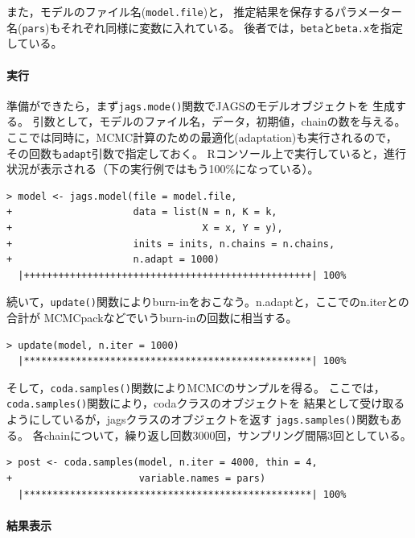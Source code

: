 \documentclass[11pt,uplatex]{jsarticle}
\begin{document}
また，モデルのファイル名(\texttt{model.file})と，
推定結果を保存するパラメーター名(\texttt{pars})もそれぞれ同様に変数に入れている。
後者では，\texttt{beta}と\texttt{beta.x}を指定している。


\paragraph{実行}

準備ができたら，まず\texttt{jags.mode()}関数でJAGSのモデルオブジェクトを
生成する。
引数として，モデルのファイル名，データ，初期値，chainの数を与える。
ここでは同時に，MCMC計算のための最適化(adaptation)も実行されるので，
その回数も\texttt{adapt}引数で指定しておく。
Rコンソール上で実行していると，進行状況が表示される（下の実行例ではもう100\%になっている）。

\begin{lstlisting}
> model <- jags.model(file = model.file,
+                     data = list(N = n, K = k,
+                                 X = x, Y = y),
+                     inits = inits, n.chains = n.chains,
+                     n.adapt = 1000)
  |++++++++++++++++++++++++++++++++++++++++++++++++++| 100%
\end{lstlisting}

続いて，\texttt{update()}関数によりburn-inをおこなう。n.adaptと，ここでのn.iterとの合計が
MCMCpackなどでいうburn-inの回数に相当する。

\begin{lstlisting}
> update(model, n.iter = 1000)
  |**************************************************| 100%
\end{lstlisting}

そして，\texttt{coda.samples()}関数によりMCMCのサンプルを得る。
ここでは，\texttt{coda.samples()}関数により，\textsf{coda}クラスのオブジェクトを
結果として受け取るようにしているが，\textsf{jags}クラスのオブジェクトを返す
\texttt{jags.samples()}関数もある。
各chainについて，繰り返し回数3000回，サンプリング間隔3回としている。

\begin{lstlisting}
> post <- coda.samples(model, n.iter = 4000, thin = 4,
+                      variable.names = pars)
  |**************************************************| 100%
\end{lstlisting}


\paragraph{結果表示}
\end{document}

